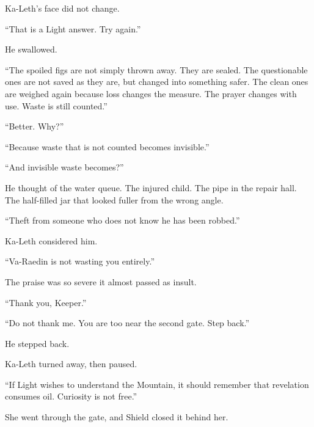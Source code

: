 Ka-Leth’s face did not change.\par

“That is a Light answer.
Try again.”\par

He swallowed.\par

“The spoiled figs are not simply thrown away.
They are sealed.
The questionable ones are not saved as they are, but changed into something safer.
The clean ones are weighed again because loss changes the measure.
The prayer changes with use.
Waste is still counted.”\par

“Better.
Why?”\par

“Because waste that is not counted becomes invisible.”\par

“And invisible waste becomes?”\par

He thought of the water queue.
The injured child.
The pipe in the repair hall.
The half-filled jar that looked fuller from the wrong angle.\par

“Theft from someone who does not know he has been robbed.”\par

Ka-Leth considered him.\par

“Va-Raedin is not wasting you entirely.”\par

The praise was so severe it almost passed as insult.\par

“Thank you, Keeper.”\par

“Do not thank me.
You are too near the second gate.
Step back.”\par

He stepped back.\par

Ka-Leth turned away, then paused.\par

“If Light wishes to understand the Mountain, it should remember that revelation consumes oil.
Curiosity is not free.”\par

She went through the gate, and Shield closed it behind her.\par

